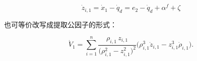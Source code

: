 \documentclass[pdflatex,sn-mathphys-num]{sn-jnl}%
\theoremstyle{thmstyleone}%
\theoremstyle{thmstyletwo}%
\newtheorem{remark}{Remark}%
\theoremstyle{thmstylethree}%
\begin{document}
$$
\dot z_{i,1}=\dot{x}_{1} - \dot{q}_{d}=  e_{2} - \dot{q}_{d}+\alpha^{f}+\zeta
$$



也可等价改写成提取公因子的形式：

$$
\dot V_1
=\sum_{i=1}^{n}
\frac{\rho_{i,1}\,z_{i,1}}{\big(\rho_{i,1}^{2}-z_{i,1}^{2}\big)^{2}}
\Big(\rho_{i,1}^{3}\dot z_{i,1}-z_{i,1}^{3}\dot\rho_{i,1}\Big).
$$




\end{document}
